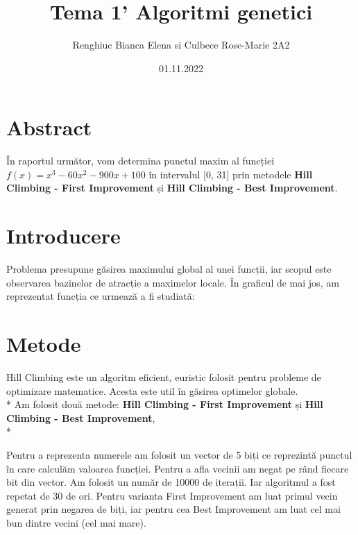\documentclass[12pt]{article}
\title{Tema 1' Algoritmi genetici}
\author{Renghiuc Bianca Elena si Culbece Rose-Marie 2A2}
\date{01.11.2022}
\begin{document}
\maketitle
\section*{Abstract}

În raportul următor, vom determina punctul maxim al funcției $f(x)=x^3-60x^2-900x+100$ în intervalul [0, 31] prin metodele \textbf{Hill Climbing - First Improvement} și \textbf{Hill Climbing - Best Improvement}.

\section{Introducere}


Problema presupune găsirea maximului global al unei funcții, iar scopul este observarea bazinelor de atracție a maximelor locale. În graficul de mai jos, am reprezentat funcția ce urmează a fi studiată: \\





\section{Metode}

Hill Climbing este un algoritm eficient, euristic folosit pentru probleme de optimizare matematice. Acesta este util în găsirea optimelor globale. \\*
Am folosit două metode: {\textbf{Hill Climbing - First Improvement}} și {\textbf{Hill Climbing - Best Improvement}},   \\*

Pentru a reprezenta numerele am folosit un vector de 5 biți ce reprezintă punctul în care calculăm valoarea funcției. Pentru a afla vecinii am negat pe rând fiecare bit din vector. Am folosit un număr de 10000 de iterații. Iar algoritmul a fost repetat de 30 de ori.
Pentru varianta First Improvement am luat primul vecin generat prin negarea de biți, iar pentru cea Best Improvement am luat cel mai bun dintre vecini (cel mai mare).
\end{document}
